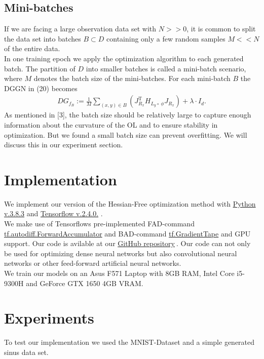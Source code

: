 \documentclass[conference]{IEEEtran}
\begin{document}
	\subsection{Mini-batches}
	\noindent
	If we are facing a large observation data set with $N>>0$, it is common to split the data set into batches $B\subset D$ containing only a few random samples $M<<N$ of the entire data. \\
	In one training epoch we apply the optimization algorithm to each generated batch. The partition of $D$ into smaller batches is called a mini-batch scenario, where $M$ denotes the batch size of the mini-batches. For each mini-batch $B$ the DGGN in (20) becomes
	\begin{align}
	DG_{f_{B}} := \frac{1}{M}\sum_{(x, y)\in B}^{}\left(J_{R_{x}}^{\mathrm{T}}H_{L_{y}\circ\:\phi}J_{R_{x}}\right) + \lambda\cdot I_{d}.
	\end{align}
	As mentioned in [3], the batch size should be relatively large to capture enough information about the curvature of the OL and to ensure stability in optimization. But we found a small batch size can prevent overfitting. We will discuss this in our experiment section.
	
	
	
	\section {Implementation}
	\noindent
	We implement our version of the Hessian-Free optimization method with \href{https://www.python.org/}{Python v.3.8.3} and \href{https://www.tensorflow.org/}{Tensorflow v.2.4.0.} .
	\\We make use of Tensorflows pre-implemented FAD-command \href{https://www.tensorflow.org/api_docs/python/tf/autodiff/ForwardAccumulator}{tf.autodiff.ForwardAccumulator} and BAD-command \href{https://www.tensorflow.org/api_docs/python/tf/GradientTape}{tf.GradientTape} and GPU support. Our code is avilable at our \href{https://github.com/NiklasBrunn/Hessian_Free_Optimization_of_Deep_Neural_Networks}{GitHub repository}$\:$. Our code can not only be used for optimizing dense neural networks but also convolutional neural networks or other feed-forward artificial neural networks.
	\\We train our models on an Asus F571 Laptop with 8GB RAM, Intel Core i5-9300H and GeForce GTX 1650 4GB VRAM.
	
	
	\section{Experiments}
	\noindent
	To test our implementation we used the MNIST-Dataset and a simple generated sinus data set.
	
\end{document}
